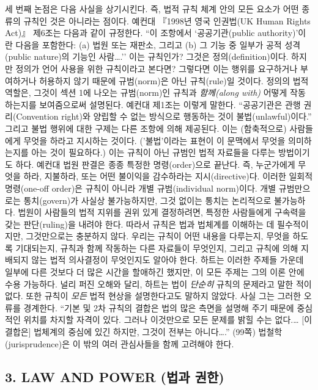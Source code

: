 \documentclass[12pt, oneside]{book}  %
\begin{document}
세 번째 논점은 다음 사실을 상기시킨다. 즉, 법적 규칙 체계 안의 모든
요소가 어떤 종류의 규칙인 것은 아니라는 점이다. 예컨대 『1998년 영국
인권법(UK Human Rights Act)』 제6조는 다음과 같이 규정한다. ``이
조항에서 `공공기관(public authority)'이란 다음을 포함한다: (a) 법원 또는
재판소, 그리고 (b) 그 기능 중 일부가 공적 성격(public nature)의 기능인
사람\ldots.'' 이는 규칙인가? 그것은 정의(definition)이다. 하지만 정의가
언어 사용을 위한 규칙이라고 본다면? 그렇다면 이는 행위를 요구하거나
부여하거나 허용하지 않기 때문에 규범(norm)은 아닌 규칙(rule)일 것이다.
정의의 법적 역할은, 그것이 섹션 1에 나오는 규범(norm)인 규칙과
\emph{함께(along with)} 어떻게 작동하는지를 보여줌으로써 설명된다.
예컨대 제1조는 이렇게 말한다. ``공공기관은 관행 권리(Convention right)와
양립할 수 없는 방식으로 행동하는 것이 불법(unlawful)이다.'' 그리고 불법
행위에 대한 구제는 다른 조항에 의해 제공된다. 이는 (함축적으로)
사람들에게 무엇을 하라고 지시하는 것이다. ('불법'이라는 표현이 이
문맥에서 무엇을 의미하는지를 아는 것이 필요하다.) 이는 규칙이 아닌
규범인 법적 자료들을 다루는 방법이기도 하다. 예컨대 법원 판결은 종종
특정한 명령(order)으로 끝난다. 즉, 누군가에게 무엇을 하라, 지불하라,
또는 어떤 불이익을 감수하라는 지시(directive)다. 이러한 일회적
명령(one-off order)은 규칙이 아니라 개별 규범(individual norm)이다. 개별
규범만으로는 통치(govern)가 사실상 불가능하지만, 그것 없이는 통치는
논리적으로 불가능하다. 법원이 사람들의 법적 지위를 권위 있게 결정하려면,
특정한 사람들에게 구속력을 갖는 판단(ruling)을 내려야 한다. 따라서
규칙은 법과 법체계를 이해하는 데 필수적이지만, 그것만으로는 충분하지
않다. 우리는 규칙이 어떤 내용을 다루는지, 무엇을 하도록 기대되는지,
규칙과 함께 작동하는 다른 자료들이 무엇인지, 그리고 규칙에 의해 지배되지
않는 법적 의사결정이 무엇인지도 알아야 한다. 하트는 이러한 주제들 가운데
일부에 다른 것보다 더 많은 시간을 할애하긴 했지만, 이 모든 주제는 그의
이론 안에 수용 가능하다. 널리 퍼진 오해와 달리, 하트는 법이
\emph{단순히} 규칙의 문제라고 말한 적이 없다. 또한 규칙이 \emph{모든}
법적 현상을 설명한다고도 말하지 않았다. 사실 그는 그러한 오류를
경계한다. ``기본 및 2차 규칙의 결합은 법의 많은 측면을 설명해 주기
때문에 중심적인 위치를 차지할 자격이 있다. 그러나 이것만으로 모든 문제를
밝힐 수는 없다.\ldots{} {[}이 결합은{]} 법체계의 중심에 있긴 하지만,
그것이 전부는 아니다\ldots.'' (99쪽) 법철학(jurisprudence)은 이 밖의
여러 관심사들을 함께 고려해야 한다.

\subsection{\texorpdfstring{\textbf{3. LAW AND POWER (법과
권한)}}{3. LAW AND POWER (법과 권한)}}\label{law-and-power-uxbc95uxacfc-uxad8cuxd55c}
\end{document}
